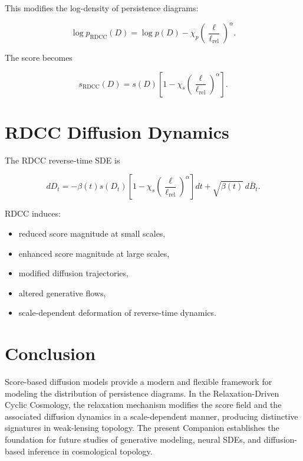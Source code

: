 \documentclass[11pt,a4paper]{article}
\begin{document}
This modifies the log-density of persistence diagrams:

\begin{equation}
    \log p_{\mathrm{RDCC}}(D)
    = \log p(D)
      - \chi_{p}
        \left(\frac{\ell}{\ell_{\mathrm{rel}}}\right)^{\alpha}.
\end{equation}

The score becomes

\begin{equation}
    s_{\mathrm{RDCC}}(D)
    = s(D)
      \left[
        1 - \chi_{s}
        \left(\frac{\ell}{\ell_{\mathrm{rel}}}\right)^{\alpha}
      \right].
\end{equation}
\section{RDCC Diffusion Dynamics}

The RDCC reverse-time SDE is

\begin{equation}
    dD_{t}
    = - \beta(t)
      s(D_{t})
      \left[
        1 - \chi_{s}
        \left(\frac{\ell}{\ell_{\mathrm{rel}}}\right)^{\alpha}
      \right]
      dt
      + \sqrt{\beta(t)} \, d\bar{B}_{t}.
\end{equation}

RDCC induces:

\begin{itemize}
    \item reduced score magnitude at small scales,
    \item enhanced score magnitude at large scales,
    \item modified diffusion trajectories,
    \item altered generative flows,
    \item scale-dependent deformation of reverse-time dynamics.
\end{itemize}
\section{Conclusion}

Score-based diffusion models provide a modern and flexible framework for modeling 
the distribution of persistence diagrams. In the Relaxation-Driven Cyclic 
Cosmology, the relaxation mechanism modifies the score field and the associated 
diffusion dynamics in a scale-dependent manner, producing distinctive signatures 
in weak-lensing topology. The present Companion establishes the foundation for 
future studies of generative modeling, neural SDEs, and diffusion-based inference 
in cosmological topology.


\nocite{*}

\end{document}

